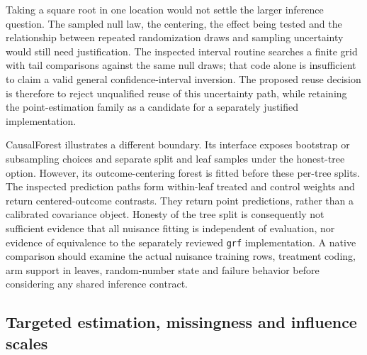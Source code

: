Taking a square root in one location would not settle the larger inference
question. The sampled null law, the centering, the effect being tested and
the relationship between repeated randomization draws and sampling
uncertainty would still need justification. The inspected interval routine
searches a finite grid with tail comparisons against the same null draws;
that code alone is insufficient to claim a valid general confidence-interval
inversion. The proposed reuse decision is therefore to reject unqualified
reuse of this uncertainty path, while retaining the point-estimation family
as a candidate for a separately justified implementation.
\citep{exec21_effects_causalelm}

CausalForest illustrates a different boundary. Its interface exposes
bootstrap or subsampling choices and separate split and leaf samples under
the honest-tree option. However, its outcome-centering forest is fitted
before these per-tree splits. The inspected prediction paths form
within-leaf treated and control weights and return centered-outcome
contrasts. They return point predictions, rather than a calibrated covariance
object. Honesty of the tree split is consequently not sufficient evidence
that all nuisance fitting is independent of evaluation, nor evidence of
equivalence to the separately reviewed \texttt{grf} implementation. A native
comparison should examine the actual nuisance training rows, treatment
coding, arm support in leaves, random-number state and failure behavior
before considering any shared inference contract.
\citep{exec21_effects_causalforest}

\subsection{Targeted estimation, missingness and influence scales}
\label{exec21:effects-tmle}

